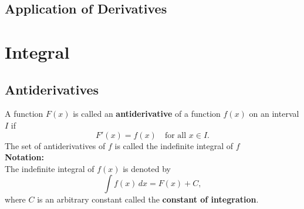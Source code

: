 \documentclass[11pt]{article}
\begin{document}
\subsection{Application of Derivatives}

\newpage

\section{Integral}
\subsection{Antiderivatives}
A function $F(x)$ is called an \textbf{antiderivative} of a function $f(x)$ on an interval $I$ if
\[
    F'(x) = f(x) \quad \text{for all } x \in I.
\]The set of antiderivatives of $f$ is called the indefinite integral of $f$\\[.5em]
\noindent
\textbf{Notation:}\\
The indefinite integral of $f(x)$ is denoted by
\[
    \int f(x)\,dx = F(x) + C,
\]
where $C$ is an arbitrary constant called the \textbf{constant of integration}.
\end{document}
